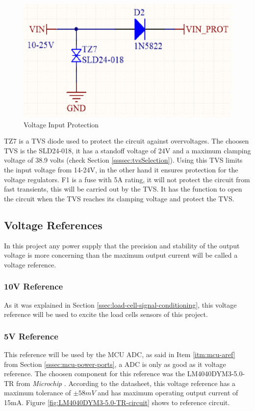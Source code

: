 			\begin{figure}[htbp]
				\centering
					\includegraphics[scale=0.4]{figuras/fig-input-protection-circuit.png}
				\caption{Voltage Input Protection \cite{input-protection-circuit}}
				\label{fig:input-protection-circuit}
			\end{figure}

			TZ7 is a TVS diode used to protect the circuit against overvoltages. The choosen TVS is the SLD24-018, it has a standoff voltage of 24V and a maximum clamping voltage of 38.9 volts (check Section \ref{ssssec:tvsSelection}). Using this TVS limits the input voltage from 14-24V, in the other hand it ensures protection for the voltage regulators. F1 is a fuse with 5A rating, it will not protect the circuit from fast transients, this will be carried out by the TVS. It has the function to open the circuit when the TVS reaches its clamping voltage and protect the TVS.

	\subsection{Voltage References}\label{ssec:voltage-references}

		In this project any power supply that the precision and stability of the output voltage is more concerning than the maximum output current will be called a voltage reference.

		\subsubsection{10V Reference}\label{sssec:10v-reference}
			As it was explained in Section \ref{ssec:load-cell-signal-conditioning}, this voltage reference will be used to excite the load cells sensors of this project.
		\subsubsection{5V Reference}\label{sssec:5v-reference}
			This reference will be used by the MCU ADC, as said in Item \ref{itm:mcu-aref} from Section \ref{sssec:mcu-power-ports}, a ADC is only as good as it voltage reference. The choosen component for this reference was the LM4040DYM3-5.0-TR from \textit{Microchip} \cite{LM4040DYM3-5.0-TR-datasheet}. According to the datasheet, this voltage reference has a maximum tolerance of $\pm 58mV$ and has maximum operating output current of 15mA. Figure \ref{fig:LM4040DYM3-5.0-TR-circuit} shows to reference circuit.

